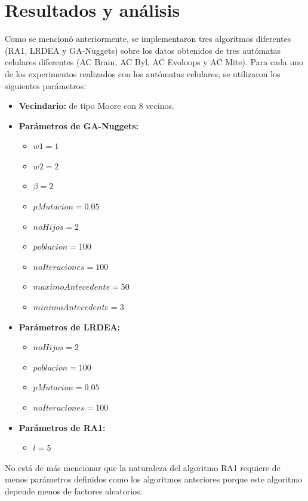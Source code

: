 \chapter{Resultados y análisis}

Como se mencionó anteriormente, se implementaron tres algoritmos diferentes (RA1, LRDEA y GA-Nuggets) sobre los datos obtenidos de tres autómatas celulares diferentes (AC Brain, AC Byl, AC Evoloops y AC Mite). Para cada uno de los experimentos realizados con los autómatas celulares, se utilizaron los siguientes parámetros:

\begin{itemize}
	\item \textbf{Vecindario:} de tipo Moore con 8 vecinos.
	\item \textbf{Parámetros de GA-Nuggets:}
	\begin{itemize}
		\item $w1=1$ 
		\item $w2=2$ 
		\item $\beta=2$ 
		\item $pMutacion=0.05$
		\item $noHijos=2$ 
		\item $poblacion=100$ 
		\item $noIteraciones=100$
		\item $maximoAntecedente=50$
		\item $minimoAntecedente=3$
	\end{itemize}
	\item \textbf{Parámetros de LRDEA:}
	\begin{itemize}
		\item $noHijos=2$
		\item $poblacion=100$
		\item $pMutacion=0.05$
		\item $noIteraciones=100$
	\end{itemize}
	\item \textbf{Parámetros de RA1:}
	\begin{itemize}
		\item $l=5$
	\end{itemize}
\end{itemize}

No está de más mencionar que la naturaleza del algoritmo RA1 requiere de menos parámetros definidos como los algoritmos anteriores porque este algoritmo depende menos de factores aleatorios.



